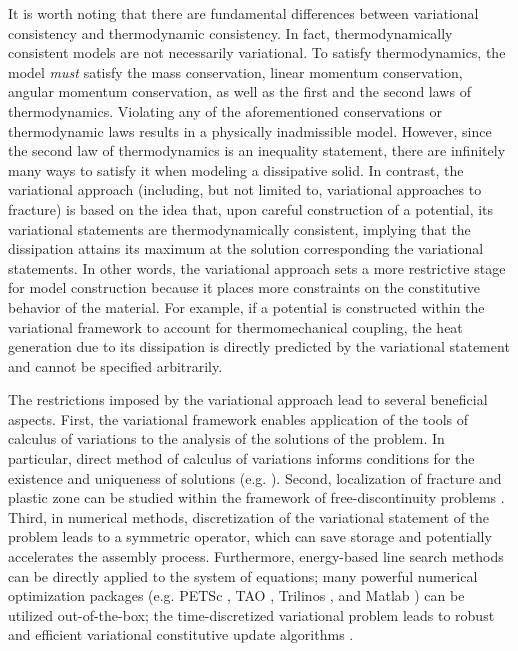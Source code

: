It is worth noting that there are fundamental differences between variational consistency and thermodynamic consistency. In fact, thermodynamically consistent models are not necessarily variational. To satisfy thermodynamics, the model \emph{must} satisfy the mass conservation, linear momentum conservation, angular momentum conservation, as well as the first and the second laws of thermodynamics. Violating any of the aforementioned conservations or thermodynamic laws results in a physically inadmissible model. However, since the second law of thermodynamics is an inequality statement, there are infinitely many ways to satisfy it when modeling a dissipative solid. In contrast, the variational approach (including, but not limited to, variational approaches to fracture) is based on the idea that, upon careful construction of a potential, its variational statements are thermodynamically consistent, implying that the dissipation attains its maximum at the solution corresponding the variational statements. In other words, the variational approach sets a more restrictive stage for model construction because it places more constraints on the constitutive behavior of the material. For example, if a potential is constructed within the variational framework to account for thermomechanical coupling, the heat generation due to its dissipation is directly predicted by the variational statement and cannot be specified arbitrarily.

The restrictions imposed by the variational approach lead to several beneficial aspects. First, the variational framework enables application of the tools of calculus of variations to the analysis of the solutions of the problem. In particular, direct method of calculus of variations informs conditions for the existence and uniqueness of solutions (e.g. \cite{dal2012introduction}). Second, localization of fracture and plastic zone can be studied within the framework of free-discontinuity problems \cite{braides1998approximation,gariepy2001functions}. Third, in numerical methods, discretization of the variational statement of the problem leads to a symmetric operator, which can save storage and potentially accelerates the assembly process. Furthermore, energy-based line search methods can be directly applied to the system of equations; many powerful numerical optimization packages (e.g. PETSc \cite{petsc-web-page}, TAO \cite{benson2003tao}, Trilinos \cite{heroux2005overview}, and Matlab \cite{higham2016matlab}) can be utilized out-of-the-box; the time-discretized variational problem leads to robust and efficient variational constitutive update algorithms \cite{ortiz_1999}.
